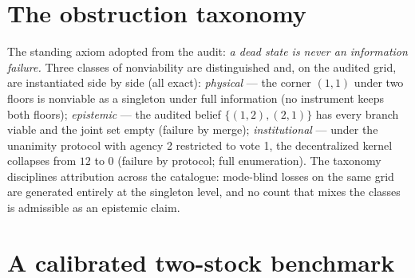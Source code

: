 \documentclass[10pt,twocolumn]{article}
\theoremstyle{definition}
\begin{document}
\section{The obstruction taxonomy}

The standing axiom adopted from the audit: \emph{a dead state is never an
information failure.} Three classes of nonviability are distinguished and,
on the audited grid, are instantiated side by side (all exact):
\emph{physical} --- the corner $(1,1)$ under two floors is nonviable as a
singleton under full information (no instrument keeps both floors);
\emph{epistemic} --- the audited belief $\{(1,2),(2,1)\}$ has every branch
viable and the joint set empty (failure by merge); \emph{institutional}
--- under the unanimity protocol with agency 2 restricted to vote 1, the
decentralized kernel collapses from $12$ to $0$ (failure by protocol;
full enumeration). The taxonomy disciplines attribution across the
catalogue: mode-blind losses on the same grid are generated entirely at the singleton level, and no count
that mixes the classes is admissible as an epistemic claim.

\section{A calibrated two-stock benchmark}
\end{document}
